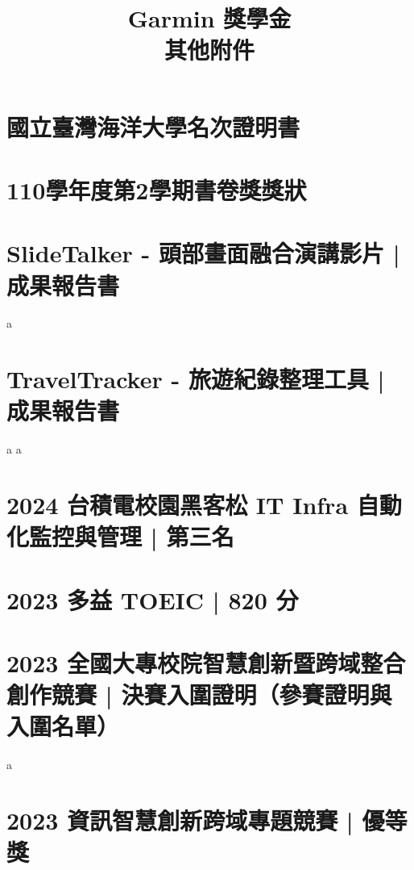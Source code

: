 \documentclass{toc}
\begin{document}
\title{Garmin 獎學金 \\ 其他附件}
\author{\texorpdfstring{\chineseMasterUniversity \chineseMasterInstitute \quad \chineseName}{\chineseMasterUniversity \chineseMasterInstitute \chineseName}}
\date{}
\maketitle

\thispagestyle{fancy}

\tableofcontents
\newpage


\section{國立臺灣海洋大學名次證明書}
\newpage

\section{110學年度第2學期書卷獎獎狀}
\newpage

\section{SlideTalker - 頭部畫面融合演講影片 | 成果報告書}
\newpage
a
\newpage

\section{TravelTracker - 旅遊紀錄整理工具 | 成果報告書}
\newpage
a
\newpage
a
\newpage

\section{2024 台積電校園黑客松 IT Infra 自動化監控與管理 | 第三名}
\newpage

\section{2023 多益 TOEIC | 820 分}
\newpage

\section{2023 全國大專校院智慧創新暨跨域整合創作競賽 | 決賽入圍證明（參賽證明與入圍名單）}
\newpage
a
\newpage
\section{2023 資訊智慧創新跨域專題競賽 | 優等獎}
\newpage
\end{document}
